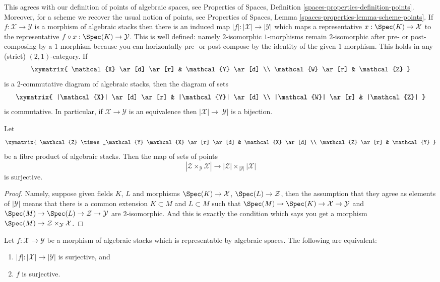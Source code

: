 \noindent
This agrees with our definition of points of algebraic spaces, see
Properties of Spaces, Definition \ref{spaces-properties-definition-points}.
Moreover, for a scheme we recover the usual notion of points, see
Properties of Spaces, Lemma \ref{spaces-properties-lemma-scheme-points}.
If $f : \mathcal{X} \to \mathcal{Y}$ is a morphism of algebraic stacks
then there is an induced map $|f| : |\mathcal{X}| \to |\mathcal{Y}|$ which
maps a representative $x : \Spec(K) \to \mathcal{X}$ to the
representative $f \circ x : \Spec(K) \to \mathcal{Y}$. This is
well defined: namely $2$-isomorphic $1$-morphisms remain $2$-isomorphic after
pre- or post-composing by a $1$-morphism because you can horizontally
pre- or post-compose by the identity of the given $1$-morphism. This holds
in any (strict) $(2, 1)$-category. If
$$
\xymatrix{
\mathcal{X} \ar[d] \ar[r] & \mathcal{Y} \ar[d] \\
\mathcal{W} \ar[r] & \mathcal{Z}
}
$$
is a $2$-commutative diagram of algebraic stacks, then the diagram
of sets
$$
\xymatrix{
|\mathcal{X}| \ar[d] \ar[r] & |\mathcal{Y}| \ar[d] \\
|\mathcal{W}| \ar[r] & |\mathcal{Z}|
}
$$
is commutative.
In particular, if $\mathcal{X} \to \mathcal{Y}$ is an equivalence
then $|\mathcal{X}| \to |\mathcal{Y}|$ is a bijection.

\begin{lemma}
\label{lemma-points-cartesian}
Let
$$
\xymatrix{
\mathcal{Z} \times_\mathcal{Y} \mathcal{X} \ar[r] \ar[d] &
\mathcal{X} \ar[d] \\
\mathcal{Z} \ar[r] & \mathcal{Y}
}
$$
be a fibre product of algebraic stacks. Then the map of sets
of points
$$
|\mathcal{Z} \times_\mathcal{Y} \mathcal{X}|
\longrightarrow
|\mathcal{Z}| \times_{|\mathcal{Y}|} |\mathcal{X}|
$$
is surjective.
\end{lemma}

\begin{proof}
Namely, suppose given fields $K$, $L$ and morphisms
$\Spec(K) \to \mathcal{X}$, $\Spec(L) \to \mathcal{Z}$,
then the assumption that they agree as elements of $|\mathcal{Y}|$ means that
there is a common extension $K \subset M$ and $L \subset M$
such that
$\Spec(M) \to \Spec(K) \to \mathcal{X} \to \mathcal{Y}$ and
$\Spec(M) \to \Spec(L) \to \mathcal{Z} \to \mathcal{Y}$
are $2$-isomorphic. And this is exactly the condition which says you get a
morphism $\Spec(M) \to \mathcal{Z} \times_\mathcal{Y} \mathcal{X}$.
\end{proof}

\begin{lemma}
\label{lemma-characterize-surjective}
Let $f : \mathcal{X} \to \mathcal{Y}$ be a morphism of algebraic stacks
which is representable by algebraic spaces. The following are equivalent:
\begin{enumerate}
\item $|f| : |\mathcal{X}| \to |\mathcal{Y}|$ is surjective, and
\item $f$ is surjective.
\end{enumerate}
\end{lemma}

